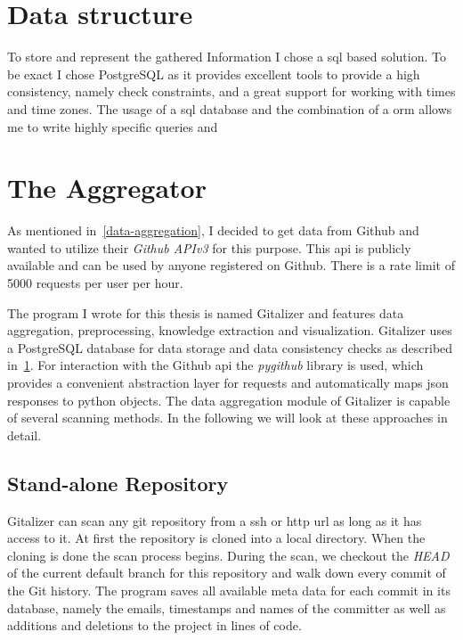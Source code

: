 \section{Data structure}\label{data-structure}

To store and represent the gathered Information I chose a \ac{sql} based solution. To be exact I chose PostgreSQL as it provides excellent tools to provide a high consistency, namely check constraints, and a great support for working with times and time zones.
The usage of a \ac{sql} database and the combination of a \ac{orm} allows me to write highly specific queries and

\section{The Aggregator}

As mentioned in~\ref{data-aggregation}, I decided to get data from Github and wanted to utilize their \emph{Github APIv3} for this purpose.
This \ac{api} is publicly available and can be used by anyone registered on Github.
There is a rate limit of 5000 requests per user per hour.

The program I wrote for this thesis is named Gitalizer and features data aggregation, preprocessing, knowledge extraction and visualization.
Gitalizer uses a PostgreSQL database for data storage and data consistency checks as described in~\ref{data-structure}.
For interaction with the Github \ac{api} the \emph{pygithub} library is used, which provides a convenient abstraction layer for requests and automatically maps \ac{json} responses to python objects.
The data aggregation module of Gitalizer is capable of several scanning methods. In the following we will look at these approaches in detail.

\subsection{Stand-alone Repository}\label{stand-alone-repository-scan}
Gitalizer can scan any git repository from a \ac{ssh} or \ac{http} \acs{url} as long as it has access to it.
At first the repository is cloned into a local directory.
When the cloning is done the scan process begins.
During the scan, we checkout the \emph{HEAD} of the current default branch for this repository and walk down every commit of the Git history.
The program saves all available meta data for each commit in its database, namely the emails, timestamps and names of the committer as well as additions and deletions to the project in lines of code.

